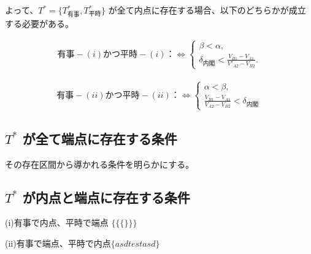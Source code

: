 \documentclass[main.tex]{subfiles}
\begin{document}
よって、$T^* = \lbrace T^*_{有事}, T^*_{平時} \rbrace$ が全て内点に存在する場合、以下のどちらかが成立する必要がある。

\begin{align*}
    有事-(i)かつ平時-(i)：\Leftrightarrow 
    \begin{cases}
        \beta < \alpha, \\
        \delta_{内閣} < \frac{V_{B1}-V_{A1}}{V'_{A2} - V_{B2}}.
    \end{cases}
\end{align*}

\begin{align*}
    有事-(ii)かつ平時-(ii)：\Leftrightarrow 
    \begin{cases}
        \alpha < \beta, \\
        \frac{V_{B1}-V_{A1}}{V_{A2} - V_{B2}} < \delta_{内閣}
    \end{cases}
\end{align*}





\subsection{$T^*$ が全て端点に存在する条件}

その存在区間から導かれる条件を明らかにする。



\subsection{$T^*$ が内点と端点に存在する条件}

(i)有事で内点、平時で端点 $\Big\{  \big\{ \{\} \big\} \Big\} $

(ii)有事で端点、平時で内点$\lbrace asd   test asd \rbrace$


\theendnotes %
\end{document}
